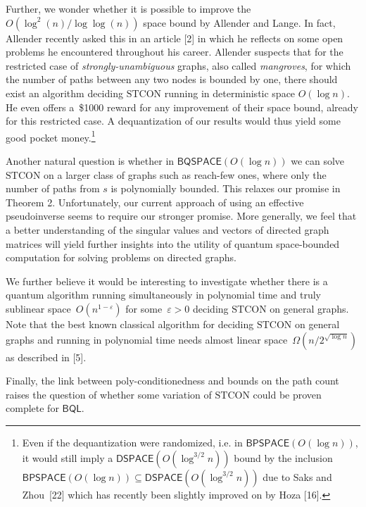 \documentclass[10pt,a4paper]{article}
\begin{document}
Further, we wonder whether it is possible to improve the $O(\log^{2}(n)/\log\log(n))$ space bound by Allender and Lange.
In fact, Allender recently asked this in an article [2] in which he reflects on some open problems he encountered throughout his career. Allender suspects that for the restricted case of \emph{strongly-unambiguous} graphs, also called \emph{mangroves}, for which the number of paths between any two nodes is bounded by one, there should exist an algorithm deciding $\mathrm{STCON}$ running in deterministic space $O(\log n)$. He even offers a \$1000 reward for any improvement of their space bound, already for this restricted case. A dequantization of our results would thus yield some good pocket money.\footnote{Even if the dequantization were randomized, i.e. in $\mathsf{BPSPACE}(O(\log n))$, it would still imply a $\mathsf{DSPACE}(O(\log^{3/2}n))$ bound by the inclusion $\mathsf{BPSPACE}(O(\log n))\subseteq\mathsf{DSPACE}(O(\log^{3/2}n))$ due to Saks and Zhou [22] which has recently been slightly improved on by Hoza [16].}\par




Another natural question is whether in $\mathsf{BQSPACE}(O(\log n))$ we can solve $\mathrm{STCON}$ on a larger class of graphs such as reach-few ones, where only the number of paths from $s$ is polynomially bounded.
This relaxes our promise in Theorem 2.
Unfortunately, our current approach of using an effective pseudoinverse seems to require our stronger promise.
More generally, we feel that a better understanding of the singular values and vectors of directed graph matrices will yield further insights into the utility of quantum space-bounded computation for solving problems on directed graphs.\par




We further believe it would be interesting to investigate whether there is a quantum algorithm running simultaneously in polynomial time and truly sublinear space $O(n^{1-\varepsilon})$ for some $\varepsilon>0$ deciding $\mathrm{STCON}$ on general graphs. Note that the best known classical algorithm for deciding $\mathrm{STCON}$ on general graphs and running in polynomial time needs almost linear space $\Omega(n/2^{\sqrt{\log n}})$ as described in [5].\par




Finally, the link between poly-conditionedness and bounds on the path count raises the question of whether some variation of $\mathrm{STCON}$ could be proven complete for $\mathsf{BQL}$.\par
\end{document}
